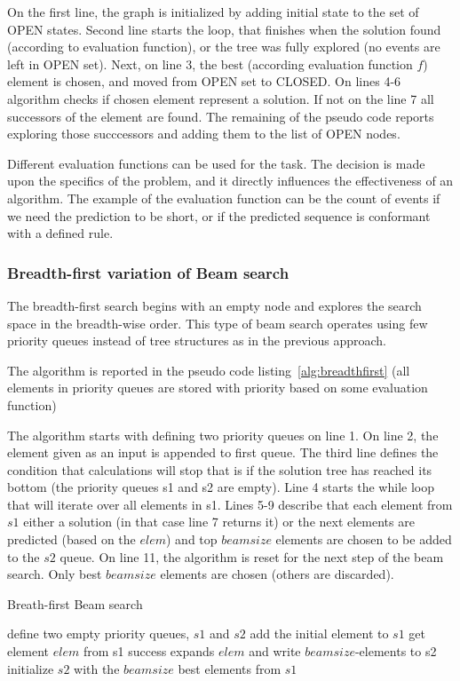 On the first line, the graph is initialized by adding initial state to the set of OPEN states. 
Second line starts the loop, that finishes when the solution found (according to evaluation function), or the tree was fully explored (no events are left in OPEN set). Next, on line 3, the best (according evaluation function $f$) element is chosen, and moved from OPEN set to CLOSED. On lines 4-6 algorithm checks if chosen element represent a solution. If not on the line 7 all successors of the element are found. The remaining of the pseudo code reports exploring those succcessors and adding them to the list of OPEN nodes. 

Different evaluation functions can be used for the task. The decision is made upon the specifics of the problem, and it directly influences the effectiveness of an algorithm. The example of the evaluation function can be the count of events if we need the prediction to be short, or if the predicted sequence is conformant with a defined rule.

\subsubsection{Breadth-first variation of Beam search}

The breadth-first search begins with an empty node and explores the search space in the breadth-wise order. This type of beam search operates using few priority queues instead of tree structures as in the previous approach. 

The algorithm is reported in the pseudo code listing~\ref{alg:breadthfirst} (all elements in priority queues are stored with priority based on some evaluation function)

The algorithm starts with defining two priority queues on line 1. On line 2, the element given as an input is appended to first queue. The third line defines the condition that calculations will stop that is if the solution tree has reached its bottom (the priority queues s1 and s2 are empty). Line 4 starts the while loop that will iterate over all elements in s1. Lines 5-9 describe that each element from $s1$ either a solution (in that case line 7 returns it) or the next elements are predicted (based on the $elem$) and top $beamsize$ elements are chosen to be added to the $s2$ queue. On line 11, the algorithm is reset for the next step of the beam search. Only best $beamsize$ elements are chosen (others are discarded).


\begin{algorithm}
 	\caption{Breath-first Beam search}
	\label{alg:breadthfirst}
	\begin{algorithmic}[1]
		\State define two empty priority queues, $s1$ and $s2$
		\State add the initial element to $s1$
				\State get element $elem$ from s1
					\State	success
					\EndIf
					\State expands $elem$ and write $beamsize$-elements to s2
					\EndWhile
					\State initialize $s2$ with the $beamsize$ best elements from $s1$
					\EndWhile
	\end{algorithmic}
\end{algorithm}




